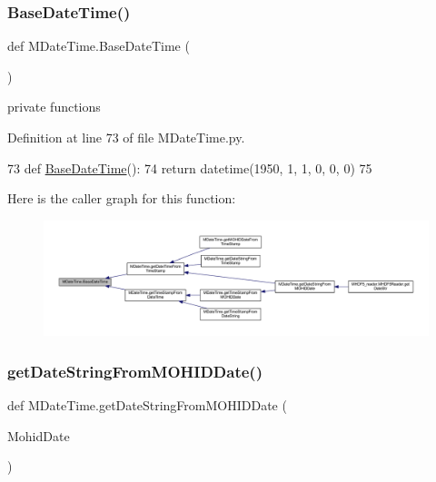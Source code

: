 \subsubsection{\texorpdfstring{Base\+Date\+Time()}{BaseDateTime()}}
{\footnotesize\ttfamily def M\+Date\+Time.\+Base\+Date\+Time (\begin{DoxyParamCaption}{ }\end{DoxyParamCaption})}



private functions 



Definition at line 73 of file M\+Date\+Time.\+py.


\begin{DoxyCode}
73 \textcolor{keyword}{def }\mbox{\hyperlink{namespace_m_date_time_a3e8d38d306730c6707a17503e2d21d6c}{BaseDateTime}}():
74     \textcolor{keywordflow}{return} datetime(1950, 1, 1, 0, 0, 0)
75 
\end{DoxyCode}
Here is the caller graph for this function\+:\nopagebreak
\begin{figure}[H]
\begin{center}
\leavevmode
\includegraphics[width=350pt]{namespace_m_date_time_a3e8d38d306730c6707a17503e2d21d6c_icgraph}
\end{center}
\end{figure}
\mbox{\label{namespace_m_date_time_a57cf43e4864af605636039c5a06672c8}} 
\subsubsection{\texorpdfstring{get\+Date\+String\+From\+M\+O\+H\+I\+D\+Date()}{getDateStringFromMOHIDDate()}}
{\footnotesize\ttfamily def M\+Date\+Time.\+get\+Date\+String\+From\+M\+O\+H\+I\+D\+Date (\begin{DoxyParamCaption}\item[{}]{Mohid\+Date }\end{DoxyParamCaption})}



